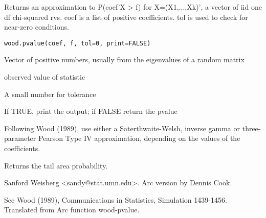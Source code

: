 \begin{Description}\relax
Returns an approximation to P(coef'X > f) for X=(X1,...,Xk)', a vector of iid
one df chi-squared rvs.  coef is a list of positive coefficients. tol is used
to check for near-zero conditions.
\end{Description}
\begin{Usage}
\begin{verbatim}
wood.pvalue(coef, f, tol=0, print=FALSE)
\end{verbatim}
\end{Usage}
\begin{Arguments}
\begin{ldescription}
\item[\code{coef}] Vector of positive numbers, usually from the eigenvalues of a
random matrix
\item[\code{f}] observed value of statistic
\item[\code{tol}] A small number for tolerance
\item[\code{print}] If TRUE, print the output; if FALSE return the pvalue
\end{ldescription}
\end{Arguments}
\begin{Details}\relax
Following Wood (1989), use either a Saterthwaite-Welsh, inverse gamma or
three-parameter Pearson Type IV approximation, depending on the values of
the coefficients.
\end{Details}
\begin{Value}
Returns the tail area probability.
\end{Value}
\begin{Author}\relax
Sanford Weisberg <sandy@stat.umn.edu>.  Arc version by Dennis
Cook.
\end{Author}
\begin{References}\relax
See Wood (1989), Communications in Statistics, Simulation 1439-1456.
Translated from Arc function wood-pvalue.
\end{References}
\begin{SeeAlso}\relax
{}
\end{SeeAlso}

